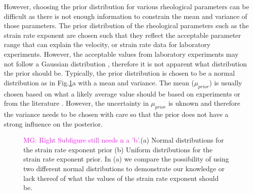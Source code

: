 \documentclass[12pt]{article}
\newcommand{\mgnote}[1]{\textcolor{magenta}{MG: #1}}
\begin{document}
However, choosing the prior distribution for various rheological parameters can be difficult as there is not enough information to constrain the mean and variance of those parameters. The prior distribution of the rheological parameters such as the strain rate exponent are chosen such that they reflect the acceptable parameter range that can explain the velocity, or strain rate data for laboratory experiments. However, the acceptable values from laboratory experiments may not follow a Gaussian distribution \citep{korenaga2008new}, therefore it is not apparent what distribution the prior should be.  Typically, the prior distribution is chosen to be a normal distribution as in Fig.\ref{fig:prior_ex}a 
 with a mean and variance. The mean ($\mu_{prior}$) is usually chosen based on what a likely average value should be based on experiments or from  the literature \citep{korenaga2008new}. However, the uncertainty in $\mu_{prior}$ is uknown and therefore the variance needs to be chosen with care so that the prior does not have a strong influence on the posterior.    %
\begin{figure}[H]
\centering
\hspace{-1.2cm}
\hspace{-0.2cm}

\caption{\mgnote{Right Subfigure still needs n a 'b'.}(a) Normal distributions for the strain rate exponent prior (b) Uniform distributions for the strain rate exponent prior. In (a) we compare the possibility of using two different normal distributions to demonstrate our knowledge or lack thereof of what the values of the strain rate exponent should be. }
\label{fig:prior_ex} 
\end{figure}
\end{document}
